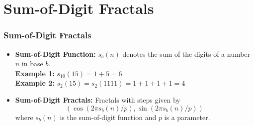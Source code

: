 \documentclass[leqno,handout]{beamer}
\begin{document}
\section {Sum-of-Digit Fractals}
\begin{frame} 

    
\frametitle{Sum-of-Digit Fractals} 

\begin{itemize}

\item  \textbf{Sum-of-Digit Function:}
$s_{b}(n)$ denotes the sum of the digits of a number $n$ in base $b$.
\\
\textbf{Example 1:} $s_{10}(15) = 1 + 5 = 6$
\\
\textbf{Example 2:} $s_{2}(15) = s_{2}(1111) = 1 + 1 + 1+ 1 = 4$

\item \textbf{Sum-of-Digit Fractals:}
Fractals with steps given by 
\[(\cos(2\pi  s_{b}(n)/p), \sin(2\pi s_{b}(n)/p))\]
where $s_b(n)$ is the sum-of-digit function and $p$ is a parameter.

\end{itemize}

\end{frame}
\end{document}
